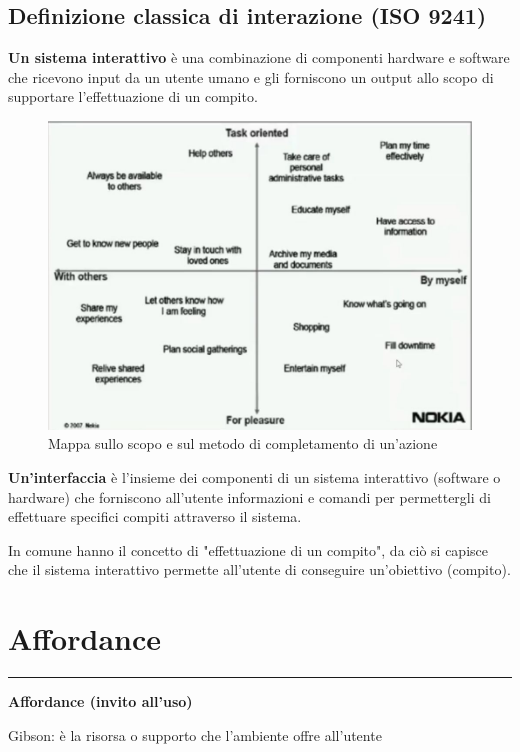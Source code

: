 \documentclass[11pt,a4paper]{book}
\begin{document}
\subsection{Definizione classica di interazione (ISO 9241)}
\textbf{Un sistema interattivo} è una combinazione di componenti hardware e software che ricevono input da un utente umano e gli forniscono un output allo scopo di supportare l'effettuazione di un compito.

\begin{figure}[h!]
	\begin{center}
		\includegraphics[scale=0.5]{img/003.jpg}
		\caption{Mappa sullo scopo e sul metodo di completamento di un'azione}
		\label{fig: 003}
	\end{center}
\end{figure}

\textbf{Un'interfaccia} è l'insieme dei componenti di un sistema interattivo (software o hardware) che forniscono all'utente informazioni e comandi per permettergli di effettuare specifici compiti attraverso il sistema.

In comune hanno il concetto di "effettuazione di un compito", da ciò si capisce che il sistema interattivo permette all'utente di conseguire un'obiettivo (compito).


\section{Affordance} \label{par: affordance}
\noindent\rule{\textwidth}{1pt}
\begin{center}
	\textbf{Affordance (invito all’uso)}
\end{center}
Gibson: è la risorsa o supporto che l'ambiente offre all'utente
\end{document}
